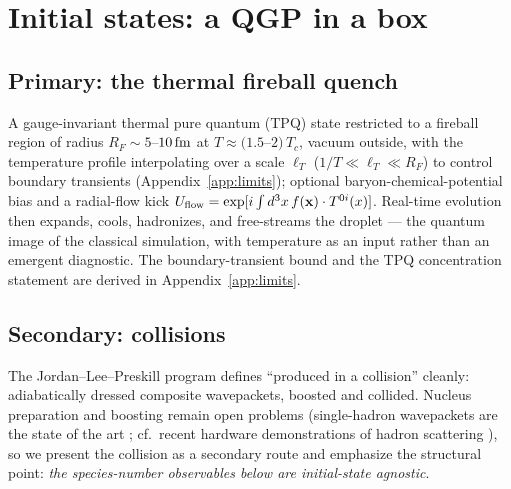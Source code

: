 \section{Initial states: a QGP in a box}
\label{sec:initial-states}

\subsection{Primary: the thermal fireball quench}

A gauge-invariant thermal pure quantum (TPQ) state \cite{Sugiura:2012xw,
Davoudi:2022uzo} restricted to a fireball region of radius
$R_F\sim 5$--$10\,\mathrm{fm}$ at $T\approx(1.5$--$2)\,T_c$, vacuum outside, with the
temperature profile interpolating over a scale $\ell_T$
($1/T \ll \ell_T \ll R_F$) to control boundary transients
(Appendix~\ref{app:limits}); optional baryon-chemical-potential bias and a
radial-flow kick $U_{\rm flow}=\exp[i\int d^3x\, f(\mathbf x)\cdot
T^{0i}(x)]$.  Real-time evolution then expands, cools, hadronizes, and
free-streams the droplet --- the quantum image of the classical simulation,
with temperature as an input rather than an emergent diagnostic.
The boundary-transient bound and the TPQ concentration statement are
derived in Appendix~\ref{app:limits}.

\subsection{Secondary: collisions}

The Jordan--Lee--Preskill program \cite{JordanLeePreskill:2012,
Jordan:2011ci} defines ``produced in a collision'' cleanly: adiabatically
dressed composite wavepackets, boosted and collided.  Nucleus preparation
and boosting remain open problems (single-hadron wavepackets are the state
of the art \cite{Davoudi:2024wyv,Farrell:2024fit}; cf.\ recent hardware
demonstrations of hadron scattering \cite{Schuhmacher:2025ehh,
Davoudi:2025qhs}), so we present the collision as a secondary route and
emphasize the structural point: \emph{the species-number observables below
are initial-state agnostic}.
